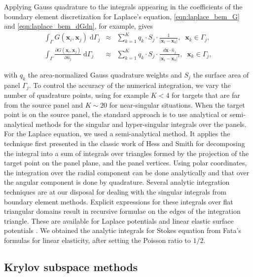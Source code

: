 \documentclass[final,leqno,]{siamltex1213}
\newcommand{\di}[1]{\text{d}#1}
\newcommand{\partiald}[2]{\frac{\partial #1}{\partial #2}}
\newcommand{\nhat}{\hat{n}}
\newcommand{\vect}[1]{\mathbf{#1}}
\begin{document}
Applying Gauss quadrature to the integrals appearing in the coefficients of the boundary element discretization for Laplace's equation, \eqref{eqn:laplace_bem_G} and \eqref{eqn:laplace_bem_dGdn}, for example, gives
%
\begin{eqnarray}
	\label{eqn:gauss:1st-kind}
	\int_{\Gamma} G(\vect{x}_i,\vect{x}_j)\;\di{\Gamma_j} & \approx & \sum_{k=1}^{K} q_k\cdot S_j\cdot \frac{1}{|\vect{x}_i-\vect{x}_k|},\;\;\vect{x}_k \in \Gamma_j, \\ 
	\label{eqn:gauss:2nd-kind}
	\int_{\Gamma} \partiald{G(\vect{x}_i,\vect{x}_j)}{\nhat_j}\;\di{\Gamma_j} & \approx & \sum_{k=1}^{K}q_k\cdot S_j\cdot \frac{d\vect{x}\cdot\nhat_j}{|\vect{x}_i-\vect{x}_k|^{3}},\;\;\vect{x}_k \in \Gamma_j,
\end{eqnarray}

\noindent
with $q_k$ the area-normalized Gauss quadrature weights and $S_j$ the surface area of panel $\Gamma_j$. To control the accuracy of the numerical integration, we vary the number of quadrature points, using for example $K< 4$ for targets that are far from the source panel and $K\sim 20$ for near-singular situations. 
When the target point is on the source panel, the standard approach is to use analytical or semi-analytical methods for the singular and hyper-singular integrals over the panels.
For the Laplace equation, we used a semi-analytical method. 
It applies the technique first presented in the classic work of Hess and Smith \cite[p.~49, ff.]{HessSmith1967} for decomposing the integral into a sum of integrals over triangles formed by the projection of the target point on the panel plane, and the panel vertices. Using polar coordinates, the integration over the radial component can be done analytically and that over the angular component is done by quadrature. %
Several analytic integration techniques are at our disposal for dealing with the singular integrals from boundary element methods. Explicit expressions for these integrals over flat triangular domains result in recursive formulae on the edges of the integration triangle. These are available for Laplace potentials \cite{Fata2009} and linear elastic surface potentials \cite{Fata2011}. 
We obtained the analytic integrals for Stokes equation from Fata's formulas for linear elasticity, after setting the Poisson ratio to $1/2$. 

\subsection{Krylov subspace methods}
\end{document}
